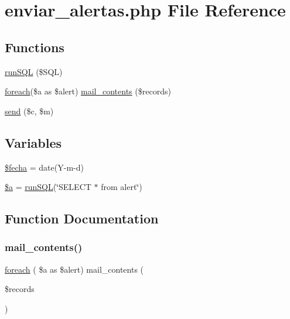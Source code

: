 \hypertarget{enviar__alertas_8php}{}\section{enviar\+\_\+alertas.\+php File Reference}
\label{enviar__alertas_8php}
\subsection*{Functions}
\begin{DoxyCompactItemize}
\item 
\hyperlink{enviar__alertas_8php_a508906286211b4a6c5c393195505b870}{run\+S\+QL} (\$S\+QL)
\item 
\hyperlink{lista_ofertas_8php_ac5fb0d39759ff645b2b7df05daca83eb}{foreach}(\$a as \$alert) \hyperlink{enviar__alertas_8php_afea96bc9f172c253a8d9e258c7298c33}{mail\+\_\+contents} (\$records)
\item 
\hyperlink{enviar__alertas_8php_a5a6b091d97e3846aeb1b6fe205d1f3f4}{send} (\$c, \$m)
\end{DoxyCompactItemize}
\subsection*{Variables}
\begin{DoxyCompactItemize}
\item 
\hyperlink{enviar__alertas_8php_a9cdc3f8485a8f697cc1a94e01e815794}{\$fecha} = date(\textquotesingle{}Y-\/m-\/d\textquotesingle{})
\item 
\hyperlink{enviar__alertas_8php_acebf83966ef6d7e5645a6b62ba368f9f}{\$a} = \hyperlink{run__sql_8php_a508906286211b4a6c5c393195505b870}{run\+S\+QL}(\char`\"{}S\+E\+L\+E\+CT $\ast$ from alert\char`\"{})
\end{DoxyCompactItemize}


\subsection{Function Documentation}
\hypertarget{enviar__alertas_8php_afea96bc9f172c253a8d9e258c7298c33}{}\label{enviar__alertas_8php_afea96bc9f172c253a8d9e258c7298c33} 
\subsubsection{\texorpdfstring{mail\+\_\+contents()}{mail\_contents()}}
{\footnotesize\ttfamily \hyperlink{lista_ofertas_8php_ac5fb0d39759ff645b2b7df05daca83eb}{foreach} ( \$a as \$alert) mail\+\_\+contents (\begin{DoxyParamCaption}\item[{}]{\$records }\end{DoxyParamCaption})}

